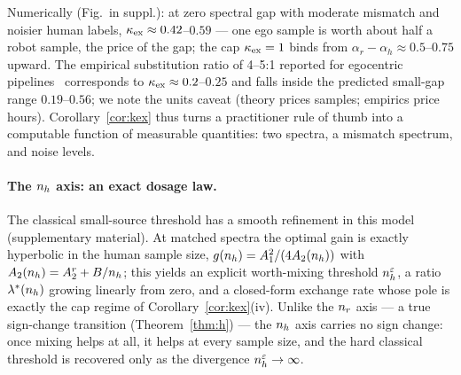 Numerically (Fig.~in suppl.): at zero spectral gap with moderate mismatch and noisier human labels, $\kappa_{\mathrm{ex}} \approx 0.42$--$0.59$ --- one ego sample is worth about half a robot sample, the price of the gap; the cap $\kappa_{\mathrm{ex}} = 1$ binds from $\alpha_r - \alpha_h \approx 0.5$--$0.75$ upward.
The empirical substitution ratio of 4--5:1 reported for egocentric pipelines~\cite{zevaego2025} corresponds to $\kappa_{\mathrm{ex}} \approx 0.2$--$0.25$ and falls inside the predicted small-gap range $0.19$--$0.56$; we note the units caveat (theory prices samples; empirics price hours).
Corollary~\ref{cor:kex} thus turns a practitioner rule of thumb into a computable function of measurable quantities: two spectra, a mismatch spectrum, and noise levels.

\paragraph{The $n_h$ axis: an exact dosage law.}
The classical small-source threshold has a smooth refinement in this model (supplementary material).
At matched spectra the optimal gain is exactly hyperbolic in the human sample size, $g(n_h) = A_1^2/(4A_2(n_h))$ with $A_2(n_h) = A_2^r + B/n_h$; this yields an explicit worth-mixing threshold $n_h^\varepsilon$, a ratio $\lambda^*(n_h)$ growing linearly from zero, and a closed-form exchange rate whose pole is exactly the cap regime of Corollary~\ref{cor:kex}(iv).
Unlike the $n_r$ axis --- a true sign-change transition (Theorem~\ref{thm:h}) --- the $n_h$ axis carries no sign change: once mixing helps at all, it helps at every sample size, and the hard classical threshold is recovered only as the divergence $n_h^\varepsilon \to \infty$.

